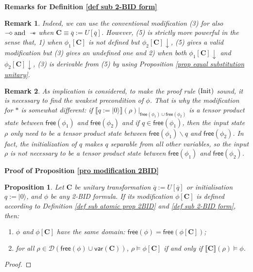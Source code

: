 \documentclass[conference,compsoc, 10pt]{IEEEtran}
\newtheorem{remark}{Remark}[section]
\newtheorem{proposition}{Proposition}[section]
\newcommand {\qI} {{q:=|0\rangle}}
\newcommand {\qU} {{\overline{q}:=U[\overline{q}]}}
\newcommand {\cD } {{\mathcal{D}}}
\newcommand {\free }[1] {{\mathsf{free}\left(#1\right)}}
\newcommand {\rt }[2] {{\left.{#1}\right|_{#2}}}
\newcommand {\var } {\mathsf{var}}
\newcommand {\prog } {{\mathbf{C}}}
\newcommand {\sepimp} {\mathrel{-\mkern-6mu*}}
\newcommand {\sem}[1] {\llbracket#1\rrbracket}
\newcommand {\sdimp} {\mathrel{-\mkern-2.5mu\diamond}}
\begin{document}
\begin{appendices}
		\vspace{0.5cm}
		
		\noindent\textbf{Remarks for Definition \ref{def sub 2-BID form}}
		
		\begin{remark}
			Indeed, we can use the conventional modification (3) for also $\sdimp \text{and}\ \sepimp$ when $\prog\equiv\qU$. However, (5) is strictly more powerful in the sense that, 1) when $\phi_1[\prog]$ is not defined but $\phi_2[\prog]\downarrow$, (5) gives a valid modification but (3) gives an undefined one and 2) when both $\phi_1[\prog]\downarrow$ and $\phi_2[\prog]\downarrow$, (3) is derivable from (5) by using Proposition \ref{prop equal substitution unitary}.
		\end{remark}
		
		
		\begin{remark}
			As implication is considered, to make the proof rule $({\rm Init})$ sound, it is necessary to find the weakest precondition of $\phi$. 
			That is why the modification for $\ast$ is somewhat different: if $\rt{\sem{\qI}(\rho)}{\free{\phi_1}\cup\free{\phi_2}}$ is a tensor product state between $\free{\phi_1}$ and $\free{\phi_2}$ and if $q\in\free{\phi_1}$, then the input state $\rho$ only need to be a tensor product state between $\free{\phi_1}\backslash q$ and $\free{\phi_2}$. In fact, the initialization of $q$ makes $q$ separable from all other variables, so the input $\rho$ is not necessary to be a tensor product state between $\free{\phi_1}$ and $\free{\phi_2}$.
		\end{remark}
		
		
		\vspace{0.5cm}
		
		\noindent\textbf{Proof of Proposition \ref{pro modification 2BID}}
		
		\begin{proposition}
			Let $\prog$ be unitary transformation $\qU$ or initialisation $\qI$, and $\phi$ be any 2-BID formula. If its modification $\phi[\prog]$ is defined according to Definition \ref{def sub atomic prop 2BID} and \ref{def sub 2-BID form}, then:
			\begin{enumerate}
				\item $\phi$ and $\phi[\prog]$ have the same domain: $\free{\phi} = \free{\phi[\prog]}$;
				\item for all $\rho\in\cD(\free{\phi}\cup\var(\prog))$, $\rho\models \phi[\prog]$ if and only if $\sem{\prog}(\rho)\models \phi$.
			\end{enumerate}
		\end{proposition}
		\begin{proof}
			

\end{proof}
\end{appendices}
\end{document}
